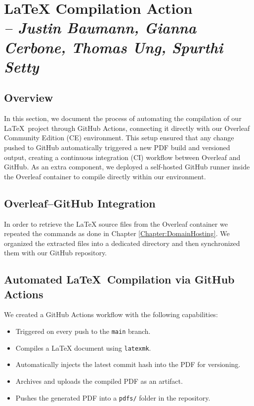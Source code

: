 \chapter{LaTeX Compilation Action \\
\small{\textit{-- Justin Baumann, Gianna Cerbone, Thomas Ung, Spurthi Setty}} 
\label{Chapter::LaTeXCompilationAction}}

\section{Overview}
In this section, we document the process of automating the compilation of our \LaTeX\ project through GitHub Actions, connecting it directly with our Overleaf Community Edition (CE) environment. This setup ensured that any change pushed to GitHub automatically triggered a new PDF build and versioned output, creating a continuous integration (CI) workflow between Overleaf and GitHub. As an extra component, we deployed a self-hosted GitHub runner inside the Overleaf container to compile directly within our environment.

\section{Overleaf--GitHub Integration}
In order to retrieve the LaTeX source files from the Overleaf container we repeated the commands as done in Chapter \ref{Chapter:DomainHosting}. We organized the extracted files into a dedicated directory and then synchronized them with our GitHub repository.

\section{Automated \LaTeX\ Compilation via GitHub Actions}
We created a GitHub Actions workflow with the following capabilities:
    \begin{itemize}
        \item Triggered on every push to the \texttt{main} branch.
        \item Compiles a \LaTeX{} document using \texttt{latexmk}.
        \item Automatically injects the latest commit hash into the PDF for versioning.
        \item Archives and uploads the compiled PDF as an artifact.
        \item Pushes the generated PDF into a \texttt{pdfs/} folder in the repository.
    \end{itemize}

